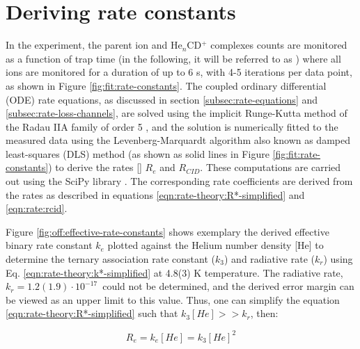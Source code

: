 \section{Deriving rate constants}
\label{subsec:rate-constants}

In the experiment, the parent ion \CD and He$_n$CD$^+$ complexes counts are
monitored as a function of trap time (in the following, it will be referred to
as ) where all ions are monitored for a duration of up to 6
s, with 4-5 iterations per data point, as shown in Figure
\ref{fig:fit:rate-constants}. The coupled ordinary differential (ODE) rate
equations, as discussed in section \ref{subsec:rate-equations} and
\ref{subsec:rate-loss-channels}, are solved using the implicit Runge-Kutta
method of the Radau IIA family of order 5 \cite{hairer_implementation_1996},
and the solution is numerically fitted to the measured data using the
Levenberg-Marquardt algorithm also known as damped least-squares (DLS) method
(as shown as solid lines in Figure \ref{fig:fit:rate-constants}) to derive the
rates [\pers] $R_e$ and $R_{CID}$. These computations are carried out using the
SciPy library \cite{virtanen_scipy_2020}. The corresponding rate coefficients
are derived from the rates as described in equations
\ref{eqn:rate-theory:R*-simplified} and \ref{eqn:rate:rcid}.




Figure \ref{fig:off:effective-rate-constants} shows exemplary the derived
effective binary rate constant $k_e$ plotted against the Helium number density
    [He] to determine the ternary association rate constant ($k_3$) and radiative
rate ($k_r$) using Eq. \ref{eqn:rate-theory:k*-simplified} at 4.8(3) K
temperature. The radiative rate, $k_r=1.2(1.9) \cdot 10^{-17}$\pers\ could not be
determined, and the derived error margin can be viewed as an upper limit to
this value. Thus, one can simplify the equation
\ref{eqn:rate-theory:R*-simplified} such that $k_3[He] >> k_r$, then:

\begin{equation}
    R_e = k_e[He] = k_3[He]^2
    \label{eqn:rate-theory:k*-further-simplified}
\end{equation}




